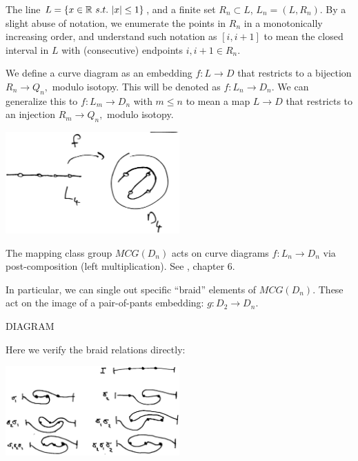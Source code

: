 \documentclass[12pt,a4paper]{article}
\begin{document}
The line $L = \{ x\in \mathbb{R}\ s.t.\ |x|\leq 1 \} $,
and a finite set $R_n\subset L$,
$L_n = (L, R_n).$
By a slight abuse of notation, we enumerate the points in $R_n$ 
in a monotonically increasing order,
and understand such notation as $[i, i+1]$ to mean the closed interval in $L$
with (consecutive) endpoints $i, i+1 \in R_n.$

We define a curve diagram as an embedding $f : L\to D$ that
restricts to a bijection $R_n\to Q_n,$ modulo
isotopy.
This will be denoted as $f : L_n\to D_n.$
We can generalize this to $f : L_m\to D_n$ with $m\leq n$
to mean a map $L\to D$ that restricts to an injection $R_m\to Q_n,$
modulo isotopy.

\begin{center}
\includegraphics[width=0.5\textwidth]{curve-diagram.eps}
\end{center}




The mapping class group $MCG(D_n)$ acts on curve diagrams $f : L_n\to D_n$
via post-composition (left multiplication). See \cite{Dehornoy02}, chapter 6.


In particular, we can single out specific ``braid'' elements of $MCG(D_n)$.
These act on the image of a pair-of-pants embedding: $g:D_2\to D_n.$

DIAGRAM

Here we verify the braid relations directly:

\begin{center}
\includegraphics[width=0.5\textwidth]{curve-braid.eps}
\end{center}
\end{document}
